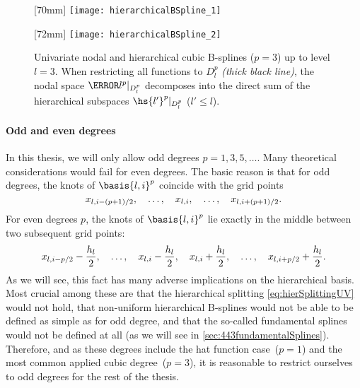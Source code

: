 \begin{figure}
  [70mm]{%
    \texttt{[image: hierarchicalBSpline\_1]}%
  }%
  \hfill%
  \hfill%
  [72mm]{%
    \texttt{[image: hierarchicalBSpline\_2]}%
  }%
  \caption{%
    Univariate nodal and hierarchical cubic B-splines ($p = 3$)
    up to level $l = 3$.
    When restricting all functions to $D_l^p$ \emph{(thick black line)},
    the nodal space $\ns{l}^p|_{D_l^p}$ decomposes into the direct sum
    of the hierarchical subspaces $\hs{l'}^p|_{D_l^p}$ ($l' \le l$).%
  }
  \label{fig:hierarchicalBSpline}
\end{figure}

\paragraph{Odd and even degrees}

In this thesis, we will only allow odd degrees $p = 1, 3, 5, \dotsc$.
Many theoretical considerations would fail for even degrees.
The basic reason is that for odd degrees, the knots of
$\basis{l,i}^p$ coincide with the grid points \cite{Valentin14Hierarchische}
\begin{equation}
  x_{l,i-(p+1)/2},\quad
  \dotsc,\quad
  x_{l,i},\quad
  \dotsc,\quad
  x_{l,i+(p+1)/2}.
\end{equation}
For even degrees $p$, the knots of $\basis{l,i}^p$ lie exactly in
the middle between two subsequent grid points:
\begin{equation}
  x_{l,i-p/2} - \frac{h_{l}}{2},\quad
  \dotsc,\quad
  x_{l,i} - \frac{h_{l}}{2},\quad
  x_{l,i} + \frac{h_{l}}{2},\quad
  \dotsc,\quad
  x_{l,i+p/2} + \frac{h_{l}}{2}.
\end{equation}
As we will see,
this fact has many adverse implications on the hierarchical basis.
Most crucial among these are
that the hierarchical splitting \eqref{eq:hierSplittingUV} would not hold,
that non-uniform hierarchical B-splines would not be able to be defined as
simple as for odd degree, and
that the so-called fundamental splines would not be defined at all
(as we will see in \cref{sec:443fundamentalSplines}).
Therefore, and
as these degrees include the hat function case~($p = 1$) and the
most common applied cubic degree~($p = 3$),
it is reasonable to restrict ourselves to odd degrees
for the rest of the thesis.



